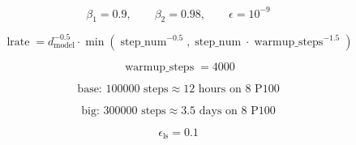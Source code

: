 \[
\beta_1=0.9,\qquad
\beta_2=0.98,\qquad
\epsilon=10^{-9}
\]

\[
\operatorname{lrate}
=
d_{\text{model}}^{-0.5}
\cdot
\min\left(
\operatorname{step\_num}^{-0.5},
\operatorname{step\_num}\cdot \operatorname{warmup\_steps}^{-1.5}
\right)
\]

\[
\operatorname{warmup\_steps}=4000
\]

\[
\text{base: }100000\text{ steps}\approx 12\text{ hours on 8 P100}
\]

\[
\text{big: }300000\text{ steps}\approx 3.5\text{ days on 8 P100}
\]

\[
\epsilon_{\text{ls}}=0.1
\]
